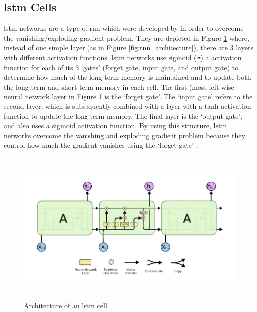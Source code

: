 \subsection{\acrlong{lstm} Cells}
\label{sec:background_lstms}
\acrshort{lstm} networks are a type of \acrlong{rnn} which were developed by \citet{hochreiter1997long} in order to overcome the vanishing/exploding gradient problem. They are depicted in Figure \ref{fig:lstm_architecture} where, instead of one simple layer (as in Figure \ref{fig:rnn_architecture}), there are 3 layers with different activation functions. \acrshort{lstm} networks use sigmoid ($\sigma$) a activation function for each of its 3 `gates' (forget gate, input gate, and output gate) to determine how much of the long-term memory is maintained and to update both the long-term and short-term memory in each cell. The first (most left-wise neural network layer in Figure \ref{fig:lstm_architecture} is the `forget gate'. The `input gate' refers to the second layer, which is subsequently combined with a layer with a tanh activation function to update the long term memory. The final layer is the `output gate', and also uses a sigmoid activation function. By using this structure, \acrshort{lstm} networks overcome the vanishing and exploding gradient problem because they control how much the gradient vanishes using the `forget gate' \citep{Gers}.

\begin{figure}[h]
    \centering
    \includegraphics[height=7.5cm,trim={0 0 0 0cm},clip]{Paper/images/lstm.png}
    \caption{Architecture of an \acrlong{lstm} cell \citep{olah2015understanding}}
    \label{fig:lstm_architecture}
\end{figure}

